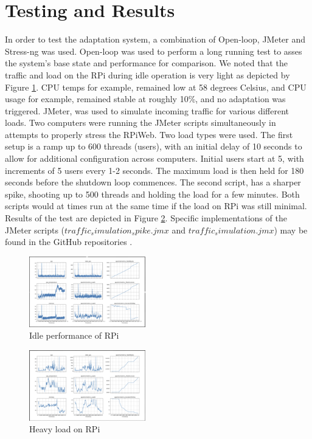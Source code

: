 \documentclass[conference]{IEEEtran}
\begin{document}
\section{\textbf{Testing and Results}}\label{test_and_results}
In order to test the adaptation system, a combination of Open-loop, JMeter and Stress-ng was used. Open-loop was used to perform a long running test to asses the system's base state and performance for comparison. We noted that the traffic and load on the RPi during idle operation is very light as depicted by Figure \ref{fig:idle_graphs}. CPU temps for example, remained low at 58 degrees Celsius, and CPU usage for example, remained stable at roughly 10\%, and no adaptation was triggered. JMeter, was used to simulate incoming traffic for various different loads. Two computers were running the JMeter scripts simultaneously in attempts to properly stress the RPiWeb. Two load types were used. The first setup is a ramp up to 600 threads (users), with an initial delay of 10 seconds to allow for additional configuration across computers. Initial users start at 5, with increments of 5 users every 1-2 seconds. The maximum load is then held for 180 seconds before the shutdown loop commences. The second script, has a sharper spike, shooting up to 500 threads and holding the load for a few minutes. Both scripts would at times run at the same time if the load on RPi was still minimal. Results of the test are depicted in Figure \ref{fig:heavy_load}. Specific implementations of the JMeter scripts ($traffic_simulation_spike.jmx$ and $traffic_simulation.jmx$) may be found in the GitHub repositories \cite{arthur_github}.

\begin{figure}[H]
    \centering
    \includegraphics[width=0.45\textwidth]{./media/idle_graphs.png}
    \caption{Idle performance of RPi}
    \label{fig:idle_graphs}
\end{figure}

\begin{figure}[H]
    \centering
    \includegraphics[width=0.45\textwidth]{./media/heavy_load.png}
    \caption{Heavy load on RPi}
    \label{fig:heavy_load}
\end{figure}
\end{document}

